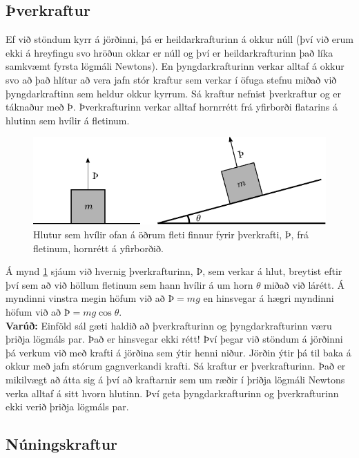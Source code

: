 \subsection*{Þverkraftur}

Ef við stöndum kyrr á jörðinni, þá er heildarkrafturinn á okkur núll (því við erum ekki á hreyfingu svo hröðun okkar er núll og því er heildarkrafturinn það líka samkvæmt fyrsta lögmáli Newtons). En þyngdarkrafturinn verkar alltaf á okkur svo að það hlítur að vera jafn stór kraftur sem verkar í öfuga stefnu miðað við þyngdarkraftinn sem heldur okkur kyrrum. Sá kraftur nefnist þverkraftur og er táknaður með $\text{Þ}$. Þverkrafturinn verkar alltaf hornrrétt frá yfirborði flatarins á hlutinn sem hvílir á fletinum. 

\begin{figure}[H]
    \centering
    \includegraphics{figures/thverkraftur.pdf}
    \caption{Hlutur sem hvílir ofan á öðrum fleti finnur fyrir þverkrafti, $\text{Þ}$, frá fletinum, hornrétt á yfirborðið.}
    \label{fig:normalforce}
\end{figure}

Á mynd \ref{fig:normalforce} sjáum við hvernig þverkrafturinn, $Þ$, sem verkar á hlut, breytist eftir því sem að við höllum fletinum sem hann hvílir á um horn $\theta$ miðað við lárétt. Á myndinni vinstra megin höfum við að $Þ = mg$ en hinsvegar á hægri myndinni höfum við að $Þ = mg\cos\theta$. \\

\textbf{Varúð:} Einföld sál gæti haldið að þverkrafturinn og þyngdarkrafturinn væru þriðja lögmáls par. Það er hinsvegar ekki rétt! Því þegar við stöndum á jörðinni þá verkum við með krafti á jörðina sem ýtir henni niður. Jörðin ýtir þá til baka á okkur með jafn stórum gagnverkandi krafti. Sá kraftur er þverkrafturinn. Það er mikilvægt að átta sig á því að kraftarnir sem um ræðir í þriðja lögmáli Newtons verka alltaf á sitt hvorn hlutinn. Því geta þyngdarkrafturinn og þverkrafturinn ekki verið þriðja lögmáls par.

\subsection*{Núningskraftur}

